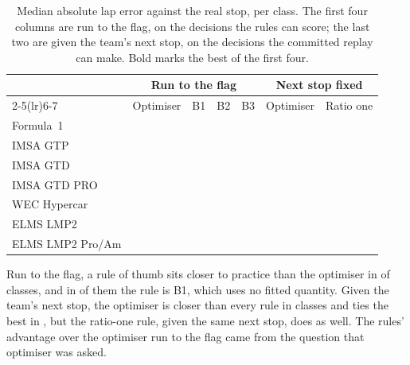 \documentclass[11pt,a4paper]{article}
\begin{document}
\begin{table}[htbp]
\centering
\caption{Median absolute lap error against the real stop, per class. The first
four columns are run to the flag, on the \NScored{} decisions the rules can
score; the last two are given the team's next stop, on the decisions the
committed replay can make. Bold marks the best of the first four.}
\label{tab:baselines}
\begin{tabular}{lrrrrrr}
\toprule
& \multicolumn{4}{c}{Run to the flag} & \multicolumn{2}{c}{Next stop fixed} \\
\cmidrule(lr){2-5}\cmidrule(lr){6-7}
& Optimiser & B1 & B2 & B3 & Optimiser & Ratio one \\
\midrule
Formula~1        & \FoneModelError{}            & \FoneBoneError{}            & \textbf{\FoneBtwoError{}}   & \FoneBthreeError{} & \FoneCommitError{} & \FoneRatioOneError{} \\
IMSA GTP         & \ImsaGtpModelError{}         & \ImsaGtpBoneError{}         & \ImsaGtpBtwoError{}         & \ImsaGtpBthreeError{} & \ImsaGtpCommitError{} & \ImsaGtpRatioOneError{} \\
IMSA GTD         & \ImsaGtdModelError{}         & \textbf{\ImsaGtdBoneError{}}     & \ImsaGtdBtwoError{}    & \ImsaGtdBthreeError{} & \ImsaGtdCommitError{} & \ImsaGtdRatioOneError{} \\
IMSA GTD PRO     & \ImsaGtdproModelError{}      & \textbf{\ImsaGtdproBoneError{}}  & \ImsaGtdproBtwoError{} & \ImsaGtdproBthreeError{} & \ImsaGtdproCommitError{} & \ImsaGtdproRatioOneError{} \\
WEC Hypercar     & \WecHypercarModelError{}     & \WecHypercarBoneError{}     & \WecHypercarBtwoError{}     & \textbf{\WecHypercarBthreeError{}} & \WecHypercarCommitError{} & \WecHypercarRatioOneError{} \\
ELMS LMP2        & \textbf{\ElmsLmptwoModelError{}} & \ElmsLmptwoBoneError{}  & \ElmsLmptwoBtwoError{}      & \ElmsLmptwoBthreeError{} & \ElmsLmptwoCommitError{} & \ElmsLmptwoRatioOneError{} \\
ELMS LMP2 Pro/Am & \ElmsLmptwoProAmModelError{} & \textbf{\ElmsLmptwoProAmBoneError{}} & \ElmsLmptwoProAmBtwoError{} & \ElmsLmptwoProAmBthreeError{} & \ElmsLmptwoProAmCommitError{} & \ElmsLmptwoProAmRatioOneError{} \\
\bottomrule
\end{tabular}
\end{table}

Run to the flag, a rule of thumb sits closer to practice than the optimiser in
\NClassesRuleWins{} of \NClassesScored{} classes, and in \NClassesBoneWins{} of
them the rule is B1, which uses no fitted quantity. Given the team's next stop,
the optimiser is closer than every rule in \NClassesCommitBeatsRules{} classes
and ties the best in \NClassesCommitTiesRules{}, but the ratio-one rule, given
the same next stop, does as well. The rules' advantage over the optimiser run
to the flag came from the question that optimiser was asked.
\end{document}
